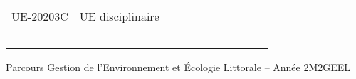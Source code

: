 \documentclass[a4paper,11pt]{article}
\begin{document}
{{\begin{tabular}{lllllllllll}
\rowcolor[HTML]{C0C0C0} 
UE-20203C                      & UE disciplinaire                                   &                           &                           &                           &                                    &                             &                             &                                    &                                  &                                  \\
                               &                                                    &                           &                           &                           &                                    &                             &                             &                                    &                                  &                                  \\
                               &                                                    &                           &                           &                           &                                    &                             &                             &                                    &                                  &                                  \\
                               &                                                    &                           &                           &                           &                                    &                             &                             &                                    &                                  &                                  \\
                               &                                                    &                           &                           &                           &                                    &                             &                             &                                    &                                  &                                  \\
                               &                                                    &                           &                           &                           &                                    &                             &                             &                                    &                                  &                                 
\end{tabular}
}
}{Parcours Gestion de l'Environnement et Écologie Littorale -- Année 2}{M2GEEL}
\end{document}
